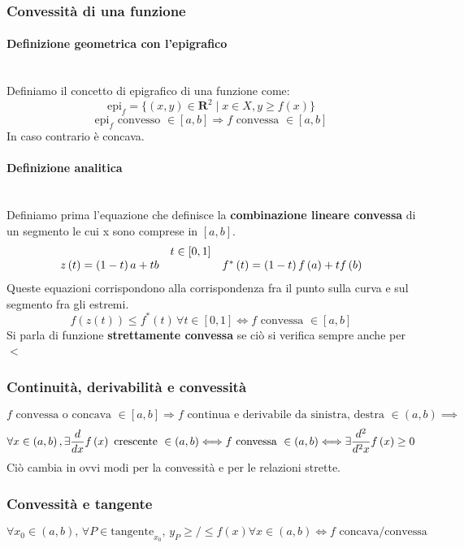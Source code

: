 \documentclass{report}
\newcommand{\subsubsubsection}[1]{\paragraph{#1}\mbox{}\\}
\begin{document}
        \subsubsection{Convessità di una funzione}
            \subsubsubsection{Definizione geometrica con l'epigrafico}
                Definiamo il concetto di epigrafico di una funzione come:
                $$\textrm{epi}_f = \{\left(x, y\right) \in \mathbf{R}^2 \mid x \in X, y \geq f\left(x\right)\}$$
                $$\textrm{epi}_f \textrm{ convesso } \in \left[a, b\right] \Longrightarrow f \textrm{ convessa } \in \left[a, b\right]$$
                In caso contrario è concava. \\
            \subsubsubsection{Definizione analitica}
                Definiamo prima l'equazione che definisce la \textbf{combinazione lineare convessa} di un segmento le cui x 
                sono comprese in $\left[a, b\right]$. 
                $$\begin{array}{l c r}
                     & t \in \left[0, 1\right] &  \\
                    z\left(t\right) = \left(1- t\right)a + tb & & f^*\left(t\right) = \left(1 - t\right)f\left(a\right) + tf\left(b\right)
                \end{array}$$
                Queste equazioni corrispondono alla corrispondenza fra il punto sulla curva e sul segmento fra gli estremi. \\
                $$f\left(z\left(t\right)\right) \leq f^*\left(t\right) \, \forall t \in \left[0, 1\right]\Longleftrightarrow f \textrm{ convessa } \in \left[a, b\right]$$
                Si parla di funzione \textbf{strettamente convessa} se ciò si verifica sempre anche per $<$
        \subsubsection{Continuità, derivabilità e convessità}
            $$f \textrm{ convessa o concava } \in \left[a, b\right] 
                \Longrightarrow f \textrm{ continua e derivabile da sinistra, destra } \in \left(a, b\right) \implies
            $$
            $$ \forall x \in \left(a, b\right), \exists \D{x}f\left(x\right) \textrm{ crescente } \in \left(a ,b\right) 
                    \Longleftrightarrow f \textrm{ convessa } \in \left(a, b\right) \Longleftrightarrow 
                    \exists \D{x}{2}f\left(x\right) \geq 0
            $$
            Ciò cambia in ovvi modi per la convessità e per le relazioni strette.
        \subsubsection{Convessità e tangente}
            $$\forall x_0 \in \left(a, b\right), \, \forall P \in \textrm{tangente}_{x_0}, 
                \, y_{P} \geq/\leq f\left(x\right) \forall x \in \left(a, b\right) \Longleftrightarrow f \textrm{ concava/convessa }$$
\end{document}
